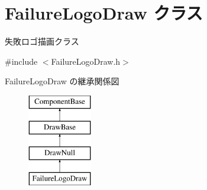 \hypertarget{class_failure_logo_draw}{}\section{Failure\+Logo\+Draw クラス}
\label{class_failure_logo_draw}


失敗ロゴ描画クラス  




{\ttfamily \#include $<$Failure\+Logo\+Draw.\+h$>$}

Failure\+Logo\+Draw の継承関係図\begin{figure}[H]
\begin{center}
\leavevmode
\includegraphics[height=4.000000cm]{class_failure_logo_draw}
\end{center}
\end{figure}
